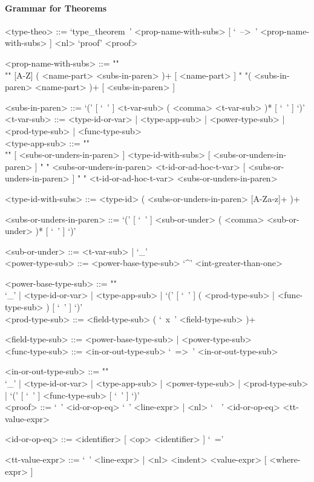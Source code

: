\documentclass{article}
\begin{document}
\newpage

\paragraph{Grammar for Theorems}

\begin{grammar}
<type-theo> ::= 
`type_theorem\ ' <prop-name-with-subs> [ `\ -->\ ' <prop-name-with-subs> ] <nl> 
`proof' <proof>

<prop-name-with-subs> ::=  ""\\""
[A-Z] ( <name-part> <subs-in-paren> )+ [ <name-part> ]
\alt " "( <subs-in-paren> <name-part> )+ [ <subs-in-paren> ]

<subs-in-paren> ::=
`(' [ `\ ' ] <t-var-sub> ( <comma> <t-var-sub> )* [ `\ ' ] `)'
\\

<t-var-sub> ::=
<type-id-or-var> | <type-app-sub> | <power-type-sub> | <prod-type-sub> |
<func-type-sub> 
\\

<type-app-sub> ::= ""\\""
[ <subs-or-unders-in-paren> ] <type-id-with-subs> [ <subs-or-unders-in-paren> ]
\alt " "
<subs-or-unders-in-paren> <t-id-or-ad-hoc-t-var> [ <subs-or-unders-in-paren> ]
\alt " "
<t-id-or-ad-hoc-t-var> <subs-or-unders-in-paren>

<type-id-with-subs> ::= <type-id> ( <subs-or-unders-in-paren> [A-Za-z]+ )+

<subs-or-unders-in-paren> ::=
`(' [ `\ ' ] <sub-or-under> ( <comma> <sub-or-under> )* [ `\ ' ] `)'

<sub-or-under> ::= <t-var-sub> | `_'
\\

<power-type-sub> ::= <power-base-type-sub> `^' <int-greater-than-one>

<power-base-type-sub> ::= ""\\
`_' | <type-id-or-var> | <type-app-sub> |
`(' [ `\ ' ] ( <prod-type-sub> | <func-type-sub> ) [ `\ ' ] `)'
\\

<prod-type-sub> ::= <field-type-sub> ( `\ x\ ' <field-type-sub> )+

<field-type-sub> ::= <power-base-type-sub> | <power-type-sub>
\\

<func-type-sub> ::= <in-or-out-type-sub> `\ =>\ ' <in-or-out-type-sub>

<in-or-out-type-sub> ::= ""\\
`_' | <type-id-or-var> | <type-app-sub> | <power-type-sub> | <prod-type-sub> |
`(' [ `\ ' ] <func-type-sub> [ `\ ' ] `)'
\\

<proof> ::= 
`\ ' <id-or-op-eq> `\ ' <line-expr> |
<nl> `\ \ ' <id-or-op-eq>  <tt-value-expr>

<id-or-op-eq> ::= <identifier> [ <op> <identifier> ] `\ ='

<tt-value-expr> ::=
`\ ' <line-expr> | <nl> <indent> <value-expr> [ <where-expr> ]
\end{grammar} 
\end{document}
